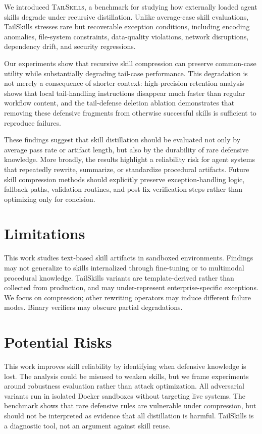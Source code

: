 \documentclass[11pt]{article}
\begin{document}
We introduced \textsc{TailSkills}, a benchmark for studying how externally loaded agent skills degrade under recursive distillation. Unlike average-case skill evaluations, TailSkills stresses rare but recoverable exception conditions, including encoding anomalies, file-system constraints, data-quality violations, network disruptions, dependency drift, and security regressions.

Our experiments show that recursive skill compression can preserve common-case utility while substantially degrading tail-case performance. This degradation is not merely a consequence of shorter context: high-precision retention analysis shows that local tail-handling instructions disappear much faster than regular workflow content, and the tail-defense deletion ablation demonstrates that removing these defensive fragments from otherwise successful skills is sufficient to reproduce failures.

These findings suggest that skill distillation should be evaluated not only by average pass rate or artifact length, but also by the durability of rare defensive knowledge. More broadly, the results highlight a reliability risk for agent systems that repeatedly rewrite, summarize, or standardize procedural artifacts. Future skill compression methods should explicitly preserve exception-handling logic, fallback paths, validation routines, and post-fix verification steps rather than optimizing only for concision.

\section*{Limitations}

This work studies text-based skill artifacts in sandboxed environments. Findings may not generalize to skills internalized through fine-tuning or to multimodal procedural knowledge. TailSkills variants are template-derived rather than collected from production, and may under-represent enterprise-specific exceptions. We focus on compression; other rewriting operators may induce different failure modes. Binary verifiers may obscure partial degradations.

\section*{Potential Risks}

This work improves skill reliability by identifying when defensive knowledge is lost. The analysis could be misused to weaken skills, but we frame experiments around robustness evaluation rather than attack optimization. All adversarial variants run in isolated Docker sandboxes without targeting live systems. The benchmark shows that rare defensive rules are vulnerable under compression, but should not be interpreted as evidence that all distillation is harmful. TailSkills is a diagnostic tool, not an argument against skill reuse.
\end{document}
